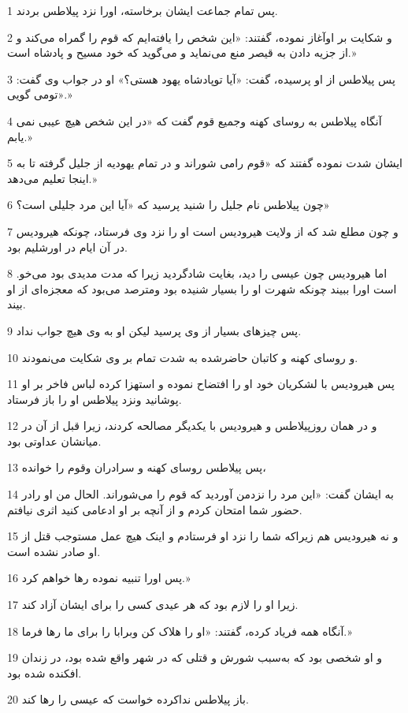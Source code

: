 \par 1 پس تمام جماعت ایشان برخاسته، اورا نزد پیلاطس بردند.
\par 2 و شکایت بر اوآغاز نموده، گفتند: «این شخص را یافته‌ایم که قوم را گمراه می‌کند و از جزیه دادن به قیصر منع می‌نماید و می‌گوید که خود مسیح و پادشاه است.»
\par 3 پس پیلاطس از او پرسیده، گفت: «آیا توپادشاه یهود هستی؟» او در جواب وی گفت: «تومی گویی.»
\par 4 آنگاه پیلاطس به روسای کهنه وجمیع قوم گفت که «در این شخص هیچ عیبی نمی یابم.»
\par 5 ایشان شدت نموده گفتند که «قوم رامی شوراند و در تمام یهودیه از جلیل گرفته تا به اینجا تعلیم می‌دهد.»
\par 6 چون پیلاطس نام جلیل را شنید پرسید که «آیا این مرد جلیلی است؟»
\par 7 و چون مطلع شد که از ولایت هیرودیس است او را نزد وی فرستاد، چونکه هیرودیس در آن ایام در اورشلیم بود.
\par 8 اما هیرودیس چون عیسی را دید، بغایت شادگردید زیرا که مدت مدیدی بود می‌خو. است اورا ببیند چونکه شهرت او را بسیار شنیده بود ومترصد می‌بود که معجزه‌ای از او بیند.
\par 9 پس چیزهای بسیار از وی پرسید لیکن او به وی هیچ جواب نداد.
\par 10 و روسای کهنه و کاتبان حاضرشده به شدت تمام بر وی شکایت می‌نمودند.
\par 11 پس هیرودیس با لشکریان خود او را افتضاح نموده و استهزا کرده لباس فاخر بر او پوشانید ونزد پیلاطس او را باز فرستاد.
\par 12 و در همان روزپیلاطس و هیرودیس با یکدیگر مصالحه کردند، زیرا قبل از آن در میانشان عداوتی بود.
\par 13 پس پیلاطس روسای کهنه و سرادران وقوم را خوانده،
\par 14 به ایشان گفت: «این مرد را نزدمن آوردید که قوم را می‌شوراند. الحال من او رادر حضور شما امتحان کردم و از آنچه بر او ادعامی کنید اثری نیافتم.
\par 15 و نه هیرودیس هم زیراکه شما را نزد او فرستادم و اینک هیچ عمل مستوجب قتل از او صادر نشده است.
\par 16 پس اورا تنبیه نموده رها خواهم کرد.»
\par 17 زیرا او را لازم بود که هر عیدی کسی را برای ایشان آزاد کند.
\par 18 آنگاه همه فریاد کرده، گفتند: «او را هلاک کن وبرابا را برای ما رها فرما.»
\par 19 و او شخصی بود که به‌سبب شورش و قتلی که در شهر واقع شده بود، در زندان افکنده شده بود.
\par 20 باز پیلاطس نداکرده خواست که عیسی را رها کند.
